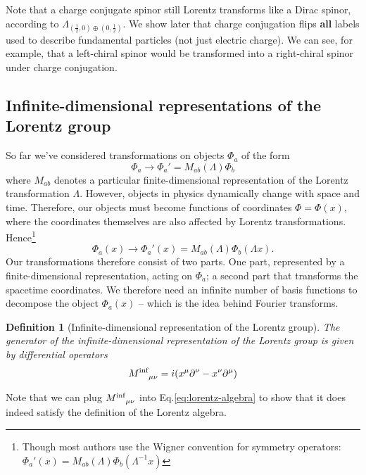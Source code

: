\documentclass[11pt]{article}
\numberwithin{equation}{section}
\newcommand{\tn}[2]{\tensor{#1}{#2}}
\newtheorem{defn}{Definition}[section]
\begin{document}
Note that a charge conjugate spinor still Lorentz transforms like a Dirac spinor, according to $\Lambda_{(\frac{1}{2},0) \oplus (0, \frac{1}{2})}$. We show later that charge conjugation flips \textbf{all} labels used to describe fundamental particles (not just electric charge). We can see, for example, that a left-chiral spinor would be transformed into a right-chiral spinor under charge conjugation. 

\subsection{Infinite-dimensional representations of the Lorentz group}
So far we've considered transformations on objects $\Phi_a$ of the form
\begin{equation}
\Phi_a \rightarrow \Phi_a' = M_{ab}(\Lambda)\Phi_b
\end{equation}
where $M_{ab}$ denotes a particular finite-dimensional representation of the Lorentz transformation $\Lambda$. However, objects in physics dynamically change with space and time. Therefore, our objects must become functions of coordinates $\Phi = \Phi(x)$, where the coordinates themselves are also affected by Lorentz transformations. Hence\footnote{Though most authors use the Wigner convention for symmetry operators: $\Phi_a'(x) = M_{ab}(\Lambda)\Phi_b(\Lambda^{-1} x)$}
\begin{equation}
\Phi_a(x) \rightarrow \Phi_a'(x) = M_{ab}(\Lambda)\Phi_b(\Lambda x).
\end{equation}
Our transformations therefore consist of two parts. One part, represented by a finite-dimensional representation, acting on $\Phi_a$; a second part that transforms the spacetime coordinates. We therefore need an infinite number of basis functions to decompose the object $\Phi_a(x)$ -- which is the idea behind Fourier transforms. 

\begin{defn}[Infinite-dimensional representation of the Lorentz group]
The generator of the infinite-dimensional representation of the Lorentz group is given by differential operators
\begin{equation}
\tn{{M^{\text{inf}}}}{_\mu_\nu} = i(x^\mu \partial^\nu - x^\nu \partial^\mu)
\end{equation}
\end{defn}
Note that we can plug $\tn{{M^{\text{inf}}}}{_\mu_\nu}$ into Eq.\eqref{eq:lorentz-algebra} to show that it does indeed satisfy the definition of the Lorentz algebra.
\end{document}
